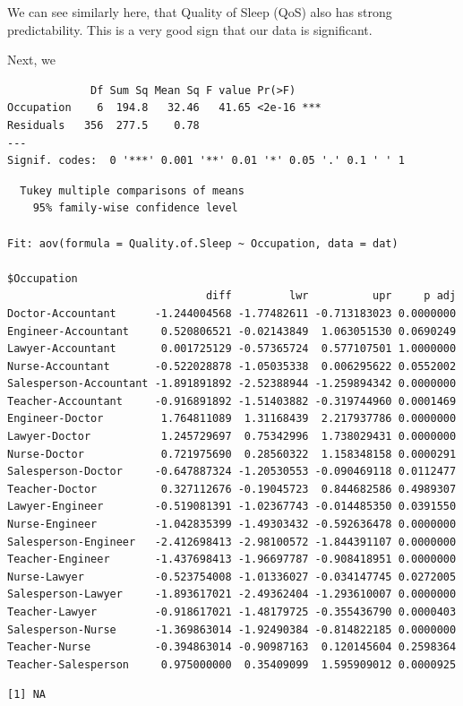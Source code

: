\documentclass[
  letterpaper,
  DIV=11,
  numbers=noendperiod]{scrartcl}
\begin{document}
We can see similarly here, that Quality of Sleep (QoS) also has strong
predictability. This is a very good sign that our data is significant.

Next, we

\begin{verbatim}
             Df Sum Sq Mean Sq F value Pr(>F)    
Occupation    6  194.8   32.46   41.65 <2e-16 ***
Residuals   356  277.5    0.78                   
---
Signif. codes:  0 '***' 0.001 '**' 0.01 '*' 0.05 '.' 0.1 ' ' 1
\end{verbatim}

\begin{verbatim}
  Tukey multiple comparisons of means
    95% family-wise confidence level

Fit: aov(formula = Quality.of.Sleep ~ Occupation, data = dat)

$Occupation
                               diff         lwr          upr     p adj
Doctor-Accountant      -1.244004568 -1.77482611 -0.713183023 0.0000000
Engineer-Accountant     0.520806521 -0.02143849  1.063051530 0.0690249
Lawyer-Accountant       0.001725129 -0.57365724  0.577107501 1.0000000
Nurse-Accountant       -0.522028878 -1.05035338  0.006295622 0.0552002
Salesperson-Accountant -1.891891892 -2.52388944 -1.259894342 0.0000000
Teacher-Accountant     -0.916891892 -1.51403882 -0.319744960 0.0001469
Engineer-Doctor         1.764811089  1.31168439  2.217937786 0.0000000
Lawyer-Doctor           1.245729697  0.75342996  1.738029431 0.0000000
Nurse-Doctor            0.721975690  0.28560322  1.158348158 0.0000291
Salesperson-Doctor     -0.647887324 -1.20530553 -0.090469118 0.0112477
Teacher-Doctor          0.327112676 -0.19045723  0.844682586 0.4989307
Lawyer-Engineer        -0.519081391 -1.02367743 -0.014485350 0.0391550
Nurse-Engineer         -1.042835399 -1.49303432 -0.592636478 0.0000000
Salesperson-Engineer   -2.412698413 -2.98100572 -1.844391107 0.0000000
Teacher-Engineer       -1.437698413 -1.96697787 -0.908418951 0.0000000
Nurse-Lawyer           -0.523754008 -1.01336027 -0.034147745 0.0272005
Salesperson-Lawyer     -1.893617021 -2.49362404 -1.293610007 0.0000000
Teacher-Lawyer         -0.918617021 -1.48179725 -0.355436790 0.0000403
Salesperson-Nurse      -1.369863014 -1.92490384 -0.814822185 0.0000000
Teacher-Nurse          -0.394863014 -0.90987163  0.120145604 0.2598364
Teacher-Salesperson     0.975000000  0.35409099  1.595909012 0.0000925
\end{verbatim}

\begin{verbatim}
[1] NA
\end{verbatim}
\end{document}

